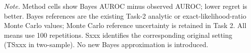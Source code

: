 \noindent\textit{Note.} Method cells show Bayes AUROC minus observed AUROC; lower regret is better. Bayes references are the existing Task-2 analytic or exact-likelihood-ratio Monte Carlo values; Monte Carlo reference uncertainty is retained in Task 2. All means use 100 repetitions. Sxxx identifies the corresponding original setting (TSxxx in two-sample). No new Bayes approximation is introduced.
\par\endgroup

